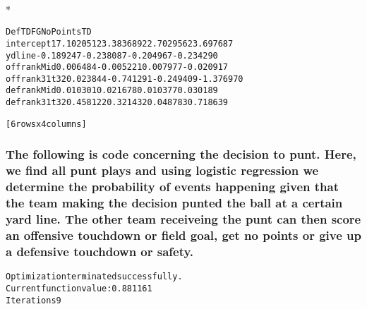 \documentclass[letterpaper,10pt,english]{/anaconda/lib/python2.7/site-packages/sphinx/texinputs/sphinxhowto}
\def\smaller{\fontsize{9.5pt}{9.5pt}\selectfont}
\newenvironment{InvisibleVerbatim}
        {\begin{mdframed}[leftmargin=0.1\linewidth,innerleftmargin=3pt,innerrightmargin=3pt, userdefinedwidth=1\linewidth, linewidth=0pt, linecolor=white, usetwoside=false]}
        {\end{mdframed}}
\begin{document}
                \makebox[0.1\linewidth]{\smaller\hfill\tt\color{nbframe-out-prompt}Out\hspace{4pt}{[}14{]}:\hspace{4pt}}\\*
                \vspace{-2.55\baselineskip}\begin{InvisibleVerbatim}
                \vspace{-0.5\baselineskip}
\begin{alltt}                  DefTD         FG   NoPoints         TD
intercept     17.102051  23.383689  22.702956  23.697687
ydline        -0.189247  -0.238087  -0.204967  -0.234290
offrankMid     0.006484  -0.005221   0.007977  -0.020917
offrank31t32   0.023844  -0.741291  -0.249409  -1.376970
defrankMid     0.010301   0.021678   0.010377   0.030189
defrank31t32   0.458122   0.321432   0.048783   0.718639

[6 rows x 4 columns]\end{alltt}

            \end{InvisibleVerbatim}
            
        
    
\subsubsection{The following is code concerning the decision to punt. Here, we find all
punt plays and using logistic regression we determine the probability of
events happening given that the team making the decision punted the ball
at a certain yard line. The other team receiveing the punt can then
score an offensive touchdown or field goal, get no points or give up a
defensive touchdown or safety.}


    

        
        

            
                \begin{InvisibleVerbatim}
                \vspace{-0.5\baselineskip}
\begin{alltt}Optimization terminated successfully.
         Current function value: 0.881161
         Iterations 9
\end{alltt}

            \end{InvisibleVerbatim}
            
\end{document}
